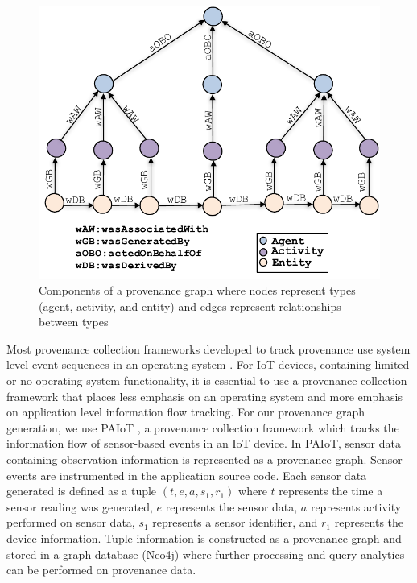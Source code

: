 
\begin{figure}[h!]
\begin{center}
\includegraphics[width=\columnwidth]{picture1_edit.pdf}
\end{center}
\caption{Components of a provenance graph where nodes represent types (agent, activity, and entity) and edges represent relationships between types}
\label{Provenance_Sensor}
\end{figure}


Most provenance collection frameworks developed to track provenance use system level event sequences in an operating system \cite{pasquier-socc2017,acsac,Muniswamy-Reddy}. For IoT devices, containing limited or no operating system functionality, it is essential to use a provenance collection framework that places less emphasis on an operating system and more emphasis on application level information flow tracking. For our provenance graph generation, we use PAIoT \cite{paiot}, a provenance collection framework which tracks the information flow of sensor-based events in an IoT device. In PAIoT, sensor data containing observation information is represented as a provenance graph. Sensor events are instrumented in the application source code. Each sensor data generated is defined as a tuple $(t, e, a, s_1, r_1)$ where $t$ represents the time a sensor reading was generated, $e$ represents the sensor data, $a$ represents activity performed on sensor data, $ s_1$ represents a sensor identifier, and $r_1$ represents the device information. Tuple information is constructed as a provenance graph and stored in a graph database (Neo4j) where further processing and query analytics can be performed on provenance data.




